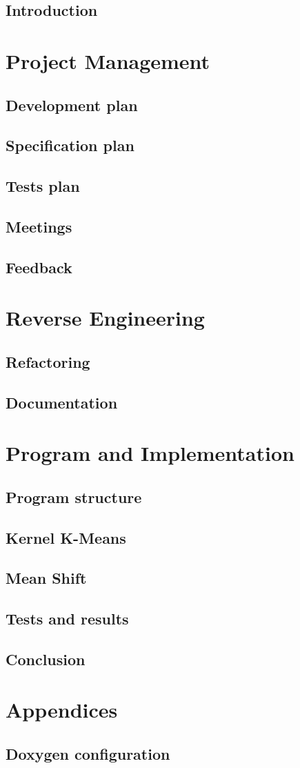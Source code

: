 \documentclass{rapport_log}
\begin{document}

\tableofcontents
	\chapter*{Introduction}
		
\part{Project Management}
	\chapter{Development plan}
		
	\chapter{Specification plan}
		
	\chapter{Tests plan}
		
	\chapter{Meetings}
		
	\chapter{Feedback}
		
\part{Reverse Engineering}
	\chapter{Refactoring}
			
	\chapter{Documentation}
		
\part{Program and Implementation}
        \chapter{Program structure}
                
	\chapter{Kernel K-Means}
		
	\chapter{Mean Shift}
		
	\chapter{Tests and results}
        
	\chapter*{Conclusion}
		
\part*{Appendices}
	\chapter*{Doxygen configuration}
		
\end{document}
